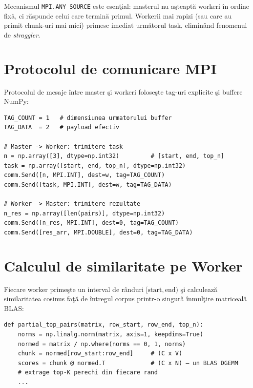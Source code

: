 \documentclass[a4paper,12pt]{report}
\begin{document}
Mecanismul \texttt{MPI.ANY\_SOURCE} este esen\c{t}ial: masterul nu a\c{s}teapt\u{a} workeri \^{i}n ordine fix\u{a}, ci r\u{a}spunde celui care termin\u{a} primul. Workerii mai rapizi (sau care au primit chunk-uri mai mici) primesc imediat urm\u{a}torul task, elimin\^{a}nd fenomenul de \textit{straggler}.

\section{Protocolul de comunicare MPI}

Protocolul de mesaje \^{i}ntre master \c{s}i workeri folose\c{s}te tag-uri explicite \c{s}i buffere NumPy:

\begin{lstlisting}[caption={Protocol mesaje Master-Worker (Python/mpi4py)}]
TAG_COUNT = 1   # dimensiunea urmatorului buffer
TAG_DATA  = 2   # payload efectiv

# Master -> Worker: trimitere task
n = np.array([3], dtype=np.int32)         # [start, end, top_n]
task = np.array([start, end, top_n], dtype=np.int32)
comm.Send([n, MPI.INT], dest=w, tag=TAG_COUNT)
comm.Send([task, MPI.INT], dest=w, tag=TAG_DATA)

# Worker -> Master: trimitere rezultate
n_res = np.array([len(pairs)], dtype=np.int32)
comm.Send([n_res, MPI.INT], dest=0, tag=TAG_COUNT)
comm.Send([res_arr, MPI.DOUBLE], dest=0, tag=TAG_DATA)
\end{lstlisting}

\section{Calculul de similaritate pe Worker}

Fiecare worker prime\c{s}te un interval de r\^{a}nduri $[\text{start}, \text{end})$ \c{s}i calculeaz\u{a} similaritatea cosinus fa\c{t}\u{a} de \^{i}ntregul corpus printr-o singur\u{a} \^{i}nmul\c{t}ire matriceal\u{a} \ac{BLAS}:

\begin{lstlisting}[caption={Calculul cosinus vectorizat pe worker}]
def partial_top_pairs(matrix, row_start, row_end, top_n):
    norms = np.linalg.norm(matrix, axis=1, keepdims=True)
    normed = matrix / np.where(norms == 0, 1, norms)
    chunk = normed[row_start:row_end]     # (C x V)
    scores = chunk @ normed.T             # (C x N) — un BLAS DGEMM
    # extrage top-K perechi din fiecare rand
    ...
\end{lstlisting}
\end{document}
